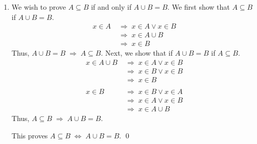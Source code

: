 \documentclass[10pt]{article}
\begin{document}
\begin{enumerate}
                
                \item
                We wish to prove $A \subseteq B$ if and only if $A \cup B = B$. We first show that $A \subseteq B$ if $A \cup B = B$.
                \begin{align*}
                        x \in A
                                \;&\Rightarrow\; x \in A \lor x \in B\\
                                \;&\Rightarrow\; x \in A \cup B\\
                                \;&\Rightarrow\; x \in B                                        \tag{$A \cup B = B$}
                \end{align*}
                Thus, $A \cup B = B \;\Rightarrow\; A \subseteq B$. Next, we show that if $A \cup B = B$ if $A \subseteq B$.
                \begin{align*}
                        x \in A \cup B
                                \;&\Rightarrow\; x \in A \lor x \in B\\
                                \;&\Rightarrow\; x \in B \lor x \in B                           \tag{$A \subseteq B$}\\
                                \;&\Rightarrow\; x \in B\\\\
                        x \in B
                                \;&\Rightarrow\; x \in B \lor x \in A\\
                                \;&\Rightarrow\; x \in A \lor x \in B\\
                                \;&\Rightarrow\; x \in A \cup B
                \end{align*}
                Thus, $A \subseteq B \;\Rightarrow\; A \cup B = B$.

                This proves $A \subseteq B \;\Leftrightarrow\; A \cup B = B$. \qed
                


\end{enumerate}
\end{document}
